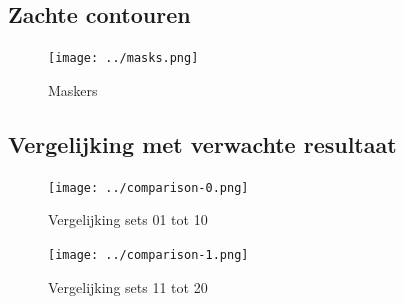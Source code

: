 \documentclass[10pt,a4paper]{article}
\begin{document}
\subsection{Zachte contouren}

\begin{figure}[H]
\centering
\texttt{[image: ../masks.png]}
\caption{Maskers}
\label{fig:masks}
\end{figure}

\subsection{Vergelijking met verwachte resultaat}
\label{appendix:comparison}

\begin{figure}[H]
\centering
\texttt{[image: ../comparison-0.png]}
\caption{Vergelijking sets 01 tot 10}
\label{fig:comparison-0}
\end{figure}

\begin{figure}[H]
\centering
\texttt{[image: ../comparison-1.png]}
\caption{Vergelijking sets 11 tot 20}
\label{fig:comparison-1}
\end{figure}
\end{document}
